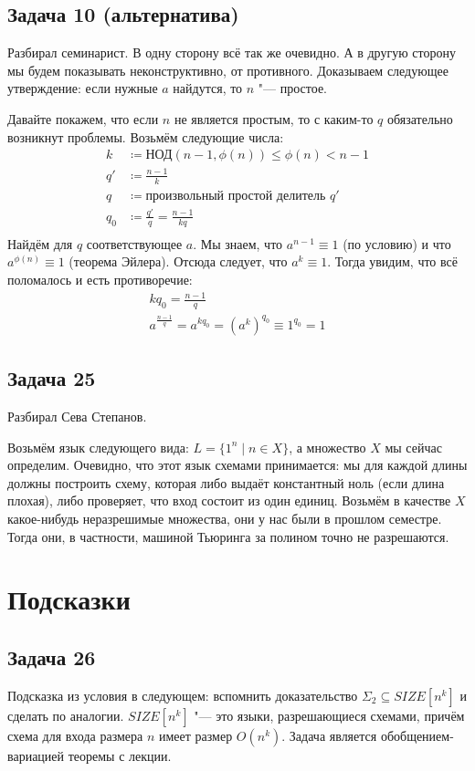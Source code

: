 \subsection{Задача 10 (альтернатива)}
	Разбирал семинарист.
	В одну сторону всё так же очевидно.
	А в другую сторону мы будем показывать неконструктивно, от противного.
	Доказываем следующее утверждение: если нужные $a$ найдутся, то $n$ "--- простое.

	Давайте покажем, что если $n$ не является простым, то с каким-то $q$ обязательно возникнут проблемы.
	Возьмём следующие числа:
	\begin{align*}
		k &\coloneq \textrm{НОД}(n-1, \phi(n)) \le \phi(n) < n - 1 \\
		q' &\coloneq \frac{n-1}{k} \\
		q &\coloneq \text{произвольный простой делитель $q'$} \\
		q_0 &\coloneq \frac{q'}{q} = \frac{n-1}{kq} \\
	\end{align*}
	Найдём для $q$ соответствующее $a$.
	Мы знаем, что $a^{n-1} \equiv 1$ (по условию) и что $a^{\phi(n)} \equiv 1$ (теорема Эйлера).
	Отсюда следует, что $a^k \equiv 1$.
	Тогда увидим, что всё поломалось и есть противоречие:
	\begin{gather*}
		kq_0 = \frac{n-1}q \\
		a^{\frac{n-1}{q}} = a^{kq_0} = (a^k)^{q_0} \equiv 1^{q_0} = 1
	\end{gather*}

\subsection{Задача 25}
	Разбирал Сева Степанов.

	Возьмём язык следующего вида: $L = \{1^n \mid n \in X\}$, а множество
	$X$ мы сейчас определим.
	Очевидно, что этот язык схемами принимается: мы для каждой длины должны построить схему,
	которая либо выдаёт константный ноль (если длина плохая), либо проверяет, что вход состоит
	из один единиц.
	Возьмём в качестве $X$ какое-нибудь неразрешимые множества, они у нас были в прошлом семестре.
	Тогда они, в частности, машиной Тьюринга за полином точно не разрешаются.

\section{Подсказки}
\subsection{Задача 26}
	Подсказка из условия в следующем: вспомнить доказательство $\Sigma_2 \subseteq SIZE[n^k]$
	и сделать по аналогии.
	$SIZE[n^k]$ "--- это языки, разрешающиеся схемами, причём схема для входа размера $n$ имеет размер $O(n^k)$.
	Задача является обобщением-вариацией теоремы с лекции.


